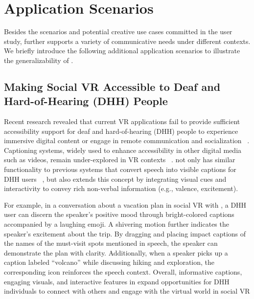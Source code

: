 \section{Application Scenarios}
\label{sec_apps}
Besides the scenarios and potential creative use cases committed in the user study, \system{} further supports a variety of communicative needs under different contexts. We briefly introduce the following additional application scenarios to illustrate the generalizability of \system{}.

\subsection{Making Social VR Accessible to Deaf and Hard-of-Hearing (DHH) People}

Recent research revealed that current VR applications fail to provide sufficient accessibility support for deaf and hard-of-hearing (DHH) people to experience immersive digital content or engage in remote communication and socialization ~\cite{jain2021towards, borna2024applications}.
Captioning systems, widely used to enhance accessibility in other digital media such as videos, remain under-explored in VR contexts ~\cite{kim2023visible, de2023visualization, de2024caption}.
\system{} not only has similar functionality to previous systems that convert speech into visible captions for DHH users ~\cite{kim2023visible, de2023visualization, li2022soundvizvr}, but also extends this concept by integrating visual cues and interactivity to convey rich non-verbal information (e.g., valence, excitement).

For example, in a conversation about a vacation plan in social VR with \system{}, a DHH user can discern the speaker’s positive mood through bright-colored captions accompanied by a laughing emoji. A shivering motion further indicates the speaker’s excitement about the trip. 
By dragging and placing impact captions of the names of the must-visit spots mentioned in speech, the speaker can demonstrate the plan with clarity. 
Additionally, when a speaker picks up a caption labeled ``volcano'' while discussing hiking and exploration, the corresponding icon reinforces the speech context.
Overall, informative captions, engaging visuals, and interactive features in \system{} expand opportunities for DHH individuals to connect with others and engage with the virtual world in social VR



